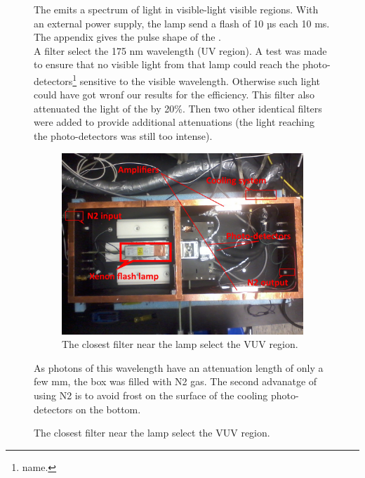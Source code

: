 \begin{figure}[!hbtp]
  
  The \xfl emits a spectrum of light in visible-light visible regions. With an external power supply, the lamp send a flash of 10 µs each 
  10 ms. The appendix gives the pulse shape of the \xfl.\\
  A filter select the 175 nm wavelength (UV region). 
  A test was made to ensure that no visible light from that lamp could reach the photo-detectors\footnote{name.} sensitive to the visible wavelength. 
  Otherwise such light could have got wronf our results for the efficiency.
  This filter also attenuated the light of the \xfl by 20\%. Then two other 
  identical filters were added to provide additional attenuations (the light reaching the photo-detectors was still too intense). 
  \\
  
  \centering
  \begin{figure}[!hbtp]  
    \includegraphics[totalheight=.35\textwidth,trim=0cm 7cm 0cm 2.5cm, clip=true,]{../Pictures/blabla/box.jpg}
    \caption{The closest filter near the lamp select the VUV region.}
    \label{fig:filter_specification}
  \end{figure}
  
  As photons of this wavelength have an attenuation length of only a few mm, the box was filled with N2 gas. The second advanatge of using 
  N2 is to avoid frost on the surface of the cooling photo-detectors on the bottom.
   

\end{figure}
